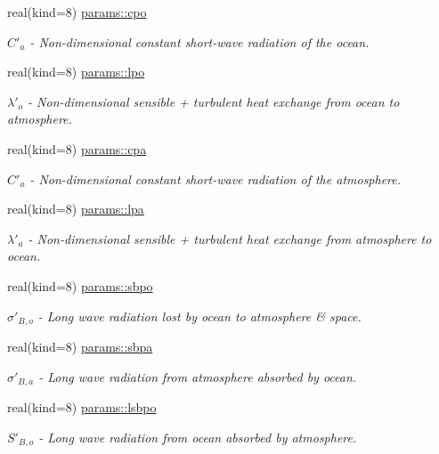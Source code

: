 \begin{DoxyCompactItemize}
real(kind=8) \hyperlink{namespaceparams_a89b8bfb0d5a9275b0301c8ebe1a92da7}{params\+::cpo}
\begin{DoxyCompactList}\small\item\em $C'_a$ -\/ Non-\/dimensional constant short-\/wave radiation of the ocean. \end{DoxyCompactList}\item 
real(kind=8) \hyperlink{namespaceparams_aa668795ed0785dc42a43980c82ba058e}{params\+::lpo}
\begin{DoxyCompactList}\small\item\em $\lambda'_o$ -\/ Non-\/dimensional sensible + turbulent heat exchange from ocean to atmosphere. \end{DoxyCompactList}\item 
real(kind=8) \hyperlink{namespaceparams_a5194d820b8962ee2b99a455a2892a2e2}{params\+::cpa}
\begin{DoxyCompactList}\small\item\em $C'_a$ -\/ Non-\/dimensional constant short-\/wave radiation of the atmosphere. \end{DoxyCompactList}\item 
real(kind=8) \hyperlink{namespaceparams_abc64b12ee840e1d848729ea868221117}{params\+::lpa}
\begin{DoxyCompactList}\small\item\em $\lambda'_a$ -\/ Non-\/dimensional sensible + turbulent heat exchange from atmosphere to ocean. \end{DoxyCompactList}\item 
real(kind=8) \hyperlink{namespaceparams_a630ac570afd5c9c7030ca416f3a860a4}{params\+::sbpo}
\begin{DoxyCompactList}\small\item\em $\sigma'_{B,o}$ -\/ Long wave radiation lost by ocean to atmosphere \& space. \end{DoxyCompactList}\item 
real(kind=8) \hyperlink{namespaceparams_abf0cb93f1f5b90e3cfd2c70d88c92d38}{params\+::sbpa}
\begin{DoxyCompactList}\small\item\em $\sigma'_{B,a}$ -\/ Long wave radiation from atmosphere absorbed by ocean. \end{DoxyCompactList}\item 
real(kind=8) \hyperlink{namespaceparams_ae29ef1b81e159c7bff47aa8303710583}{params\+::lsbpo}
\begin{DoxyCompactList}\small\item\em $S'_{B,o}$ -\/ Long wave radiation from ocean absorbed by atmosphere. \end{DoxyCompactList}\item 

\end{DoxyCompactItemize}
